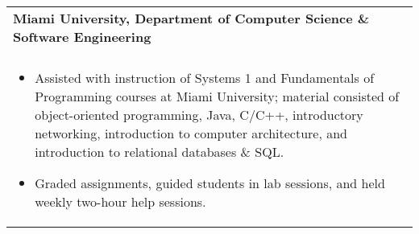 \documentclass[letterpaper,10pt]{article} %
\begin{document}
\begin{tabular*}{\linewidth}{@{\extracolsep{\fill}} lr }
\textbf{Miami University, Department of Computer Science \& Software Engineering} & \scriptsize\bfseries\color{sectioncolour}{Oxford, OH}\\
\footnotesize\bfseries\color{sectioncolour}{Teaching Assistant} & \scriptsize\bfseries\color{sectioncolour}{August 2022 - December 2023}\\
\multicolumn{2}{p{\linewidth}}{
    \scriptsize{\vspace{-0.1in}\begin{itemize}
        \item Assisted with instruction of Systems 1 and Fundamentals of Programming courses at Miami University; material consisted of object-oriented programming, Java, C/C++, introductory networking, introduction to computer architecture, and introduction to relational databases \& SQL.
        \item Graded assignments, guided students in lab sessions, and held weekly two-hour help sessions.
    \end{itemize}\vspace{-0.0in}}
}\\


\end{tabular*}
\end{document}
